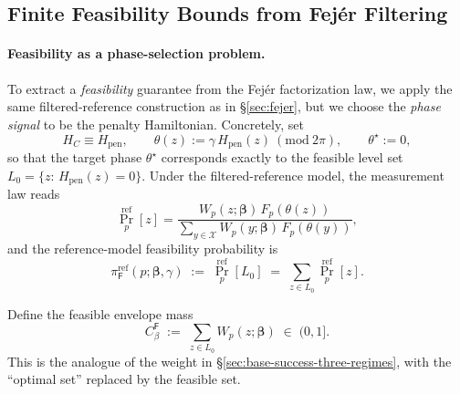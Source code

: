 \documentclass[a4paper,unpublished,onecolumn,11pt]{quantumarticle}
\theoremstyle{definition}
\theoremstyle{remark}
\begin{document}
\begin{appendix}


\section{Finite Feasibility Bounds from Fej\'er Filtering}
\label{sec:fejer-feasibility}

\paragraph{Feasibility as a phase-selection problem.}
To extract a \emph{feasibility} guarantee from the Fej\'er factorization law, we
apply the same filtered-reference construction as in \S\ref{sec:fejer}, but we choose
the \emph{phase signal} to be the penalty Hamiltonian.
Concretely, set
\[
H_C \equiv H_{\mathrm{pen}},
\qquad
\theta(z):=\gamma\,H_{\mathrm{pen}}(z)\ (\mathrm{mod}\ 2\pi),
\qquad
\theta^\star:=0,
\]
so that the target phase $\theta^\star$ corresponds exactly to the feasible level set
\(
L_0=\{z:\,H_{\mathrm{pen}}(z)=0\}.
\)
Under the filtered-reference model, the measurement law reads
\begin{equation}
\label{eq:fejer-feasibility-factor}
\Pr^{\mathrm{ref}}_{p}[z]
=
\frac{W_p(z;\boldsymbol\beta)\,F_p(\theta(z))}
{\sum_{y\in\mathcal X} W_p(y;\boldsymbol\beta)\,F_p(\theta(y))},
\end{equation}
and the reference-model feasibility probability is
\[
\pi_{\mathsf F}^{\mathrm{ref}}(p;\boldsymbol\beta,\gamma)
\;:=\;
\Pr^{\mathrm{ref}}_{p}[L_0]
\;=\;
\sum_{z\in L_0}\Pr^{\mathrm{ref}}_{p}[z].
\]


Define the feasible envelope mass
\begin{equation}
\label{eq:Cbeta-feasible}
C_{\beta}^{\mathsf F}
\;:=\;
\sum_{z\in L_0} W_p(z;\boldsymbol\beta)
\;\in\;(0,1].
\end{equation}
This is the analogue of the weight in \S\ref{sec:base-success-three-regimes},
with the ``optimal set'' replaced by the feasible set. %



\end{appendix}
\end{document}
